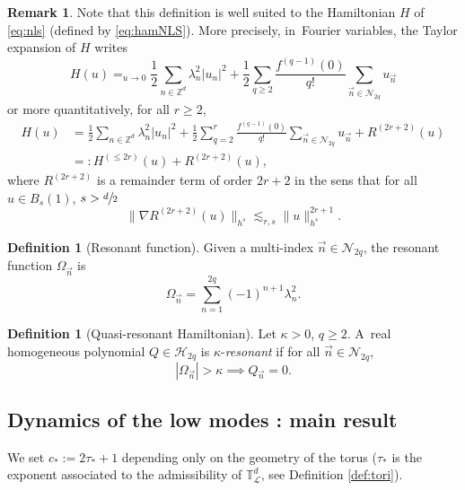 \documentclass[JEP,XML,SOM,Unicode,published]{cedram}
\theoremstyle{plain}
\theoremstyle{definition}
\newtheorem{definition}[theorem]{Definition}
\newtheorem{remark}[theorem]{Remark}
\newcommand{\1}{\mathbf{1}}
\begin{document}
\begin{remark} Note that this definition is well suited to the Hamiltonian $H$ of \eqref{eq:nls} (defined by \eqref{eq:hamNLS}). More precisely, in~Fourier variables, the Taylor expansion of $H$ writes
\[
H(u) \mathop{=}_{u \to 0} \frac12 \sum_{n\in \mathbb{Z}^d} \lambda_n^2 |u_n|^2 + \frac12 \sum_{q\geq 2} \frac{f^{(q-1)}(0)}{q!} \sum_{\vec{n}\in\mathcal{N}_{2q}} u_{\vec{n}}
\]
or more quantitatively, for all $r\geq 2$,
\begin{equation}
\label{eq:expansion_ham}
\begin{split}
H(u) &= \frac12 \sum_{n\in \mathbb{Z}^d} \lambda_n^2 |u_n|^2 + \frac12 \sum_{q=2}^r \frac{f^{(q-1)}(0)}{q!} \sum_{\vec{n}\in\mathcal{N}_{2q}} u_{\vec{n}}+ R^{(2r+2)} (u) \\ &=:H^{(\leq 2r)}(u) + R^{(2r+2)} (u),
\end{split}
\end{equation}
where $R^{(2r+2)} $ is a remainder term of order $2r+2$ in the sens that for all $u\in B_s(1)$, $s>\sfrac{d}{2}$
\begin{equation}
\label{eq:rem_NLS}
\| \nabla R^{(2r+2)} (u) \|_{h^s} \lesssim_{r,s} \| u \|_{h^s}^{2r+1}.
\end{equation}
\end{remark}

\begin{definition}[Resonant function] Given a multi-index $\vec{n}\in\mathcal{N}_{2q}$, the resonant function $\Omega_{\vec{n}}$ is
\[
\Omega_{\vec{n}} = \sum_{n=1}^{2q}(-1)^{n+1}\lambda_{n}^{2}.
\]
\end{definition}

\begin{definition}[Quasi-resonant Hamiltonian]\label{def:non-kappa} Let $\kappa>0$, $q\geq2$. A~real homogeneous polynomial $Q \in \mathcal{H}_{2q}$
is $\kappa$-\emph{resonant} if for all $\vec{n}\in\mathcal{N}_{2q}$,
\[
|\Omega_{\vec{n}}| > \kappa\implies Q_{\vec{n}} = 0.
\]
\end{definition}

\subsection{Dynamics of the low modes : main result}

We set $c_* := 2\tau_\ast +1$ depending only on the geometry of the torus ($\tau_\ast$ is the exponent associated to the admissibility of $\mathbb{T}^d_{\mathscr{L}}$, see Definition \ref{def:tori}).
\end{document}
